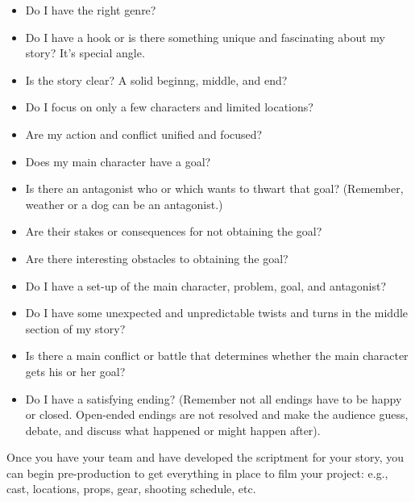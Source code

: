 \documentclass[
]{book}
\providecommand{\tightlist}{%
  \setlength{\itemsep}{0pt}\setlength{\parskip}{0pt}}
\begin{document}
\begin{reflect}
\begin{itemize}
\tightlist
\item
  Do I have the right genre?\\
\item
  Do I have a hook or is there something unique and fascinating about my story? It's special angle.\\
\item
  Is the story clear? A solid beginng, middle, and end?\\
\item
  Do I focus on only a few characters and limited locations?\\
\item
  Are my action and conflict unified and focused?\\
\item
  Does my main character have a goal?\\
\item
  Is there an antagonist who or which wants to thwart that goal? (Remember, weather or a dog can be an antagonist.)\\
\item
  Are their stakes or consequences for not obtaining the goal?\\
\item
  Are there interesting obstacles to obtaining the goal?\\
\item
  Do I have a set-up of the main character, problem, goal, and antagonist?\\
\item
  Do I have some unexpected and unpredictable twists and turns in the middle section of my story?\\
\item
  Is there a main conflict or battle that determines whether the main character gets his or her goal?\\
\item
  Do I have a satisfying ending? (Remember not all endings have to be happy or closed. Open-ended endings are not resolved and make the audience guess, debate, and discuss what happened or might happen after).
\end{itemize}

Once you have your team and have developed the scriptment for your story, you can begin pre-production to get everything in place to film your project: e.g., cast, locations, props, gear, shooting schedule, etc.
\end{reflect}
\end{document}
